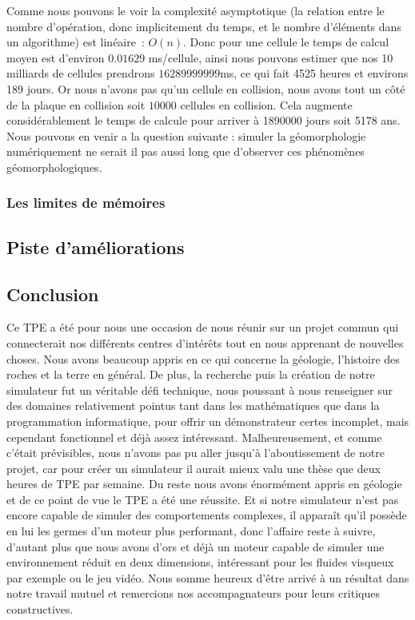 \documentclass[a4paper,11pt]{article}
\begin{document}
Comme nous pouvons le voir la complexité asymptotique (la relation entre le nombre d'opération, donc implicitement du temps, et le nombre d'éléments dans un algorithme) est linéaire~: $O(n)$.
Donc pour une cellule le temps de calcul moyen est d'environ $0.01629$ ms/cellule, ainsi nous pouvons estimer que nos 10 milliards de cellules prendrons $16289999999$ms, ce qui fait 4525 heures et environs 189 jours.
Or nous n'avons pas qu'un cellule en collision, nous avons tout un côté de la plaque en collision soit $10000$ cellules en collision.
Cela augmente considérablement le temps de calcule pour arriver à 1890000 jours soit 5178 ans.
Nous pouvons en venir a la question suivante : simuler la géomorphologie numériquement ne serait il pas aussi long que d'observer ces phénomènes géomorphologiques.

\subsubsection{Les limites de mémoires}
\subsection{Piste d'améliorations}
\subsection{Conclusion}

Ce TPE a été pour nous une occasion de nous réunir sur un projet commun qui connecterait nos différents centres d’intérêts tout en nous apprenant de nouvelles choses. Nous avons beaucoup appris en ce qui concerne la géologie, l'histoire des roches et la terre en général. De plus, la recherche puis la création de notre simulateur fut un véritable défi technique, nous poussant à nous renseigner sur des domaines relativement pointus tant dans les mathématiques que dans la programmation informatique, pour offrir un démonstrateur certes incomplet, mais cependant fonctionnel et déjà assez intéressant. Malheureusement, et comme c'était prévisibles, nous n'avons pas pu aller jusqu'à l'aboutissement de notre projet, car pour créer un simulateur il aurait mieux valu une thèse que deux heures de TPE par semaine. Du reste nous avons énormément appris en géologie et de ce point de vue le TPE a été une réussite. Et si notre simulateur n'est pas encore capable de simuler des comportements complexes, il apparaît qu'il possède en lui les germes d'un moteur plus performant, donc l'affaire reste à suivre, d'autant plus que nous avons d'ors et déjà un moteur capable de simuler une environnement réduit en deux dimensions, intéressant pour les fluides visqueux par exemple ou le jeu vidéo. Nous somme heureux d'être arrivé à un résultat dans notre travail mutuel et remercions nos accompagnateurs pour leurs critiques constructives.
\end{document}
